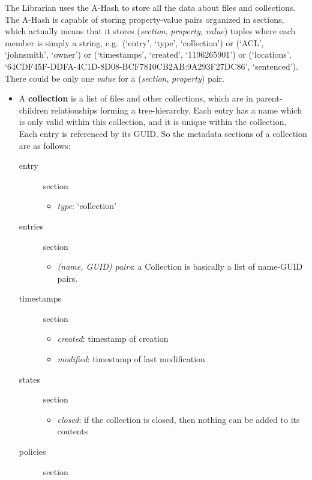 \documentclass{book}
\begin{document}
The Librarian uses the A-Hash to store all the data about files and collections. The A-Hash is capable of storing property-value pairs organized in sections, which actually means that it stores (\emph{section}, \emph{property}, \emph{value}) tuples where each member is simply a string, e.g.~(`entry', `type', `collection') or (`ACL', `johnsmith', `owner') or (`timestamps', `created', `1196265901') or (`locations', `64CDF45F-DDFA-4C1D-8D08-BCF7810CB2AB:9A293F27DC86', `sentenced'). There could be only one \emph{value} for a (\emph{section}, \emph{property}) pair.

\begin{itemize}
    \item A \textbf{collection} is a list of files and other collections, which are in parent-children relationships forming a tree-hierarchy. Each entry has a name which is only valid within this collection, and it is unique within the collection. Each entry is referenced by its GUID. So the metadata sections of a collection are as follows: 
    \begin{description}
        \item [entry] section 
        \begin{itemize}
            \item \emph{type}: `collection' 
        \end{itemize}
        \item [entries] section 
        \begin{itemize}
            \item \emph{(name, GUID) pairs}: a Collection is basically a list of name-GUID pairs. 
        \end{itemize}
        \item [timestamps] section 
        \begin{itemize}
            \item \emph{created}: timestamp of creation 
            \item \emph{modified}: timestamp of last modification 
        \end{itemize}
        \item [states] section 
        \begin{itemize}
            \item \emph{closed}: if the collection is closed, then nothing can be added to its contents 
        \end{itemize}
        \item [policies] section 
        \begin{itemize}

\end{itemize}
\end{description}
\end{itemize}
\end{document}
